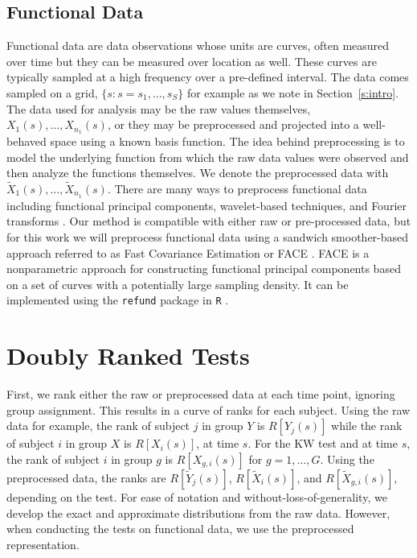 \documentclass[12pt]{article}
\theoremstyle{plain}
\begin{document}
	\subsection{Functional Data}
	
	Functional data are data observations whose units are curves, often measured over time but they can be measured over location as well. These curves are typically sampled at a high frequency over a pre-defined interval. The data comes sampled on a grid, $\{s : s = s_1, \ldots, s_S\}$ for example as we note in Section~\ref{s:intro}. The data used for analysis may be the raw values themselves, $X_1(s), \ldots, X_{n_1}(s)$, or they may be preprocessed and projected into a well-behaved space using a known basis function. The idea behind preprocessing is to model the underlying function from which the raw data values were observed and then analyze the functions themselves. We denote the preprocessed data with $\tilde{X}_1(s), \ldots, \tilde{X}_{n_1}(s)$. There are many ways to preprocess functional data including functional principal components, wavelet-based techniques, and Fourier transforms \citep{Wang2016}. Our method is compatible with either raw or pre-processed data, but for this work we will preprocess functional data using a sandwich smoother-based approach referred to as Fast Covariance Estimation or FACE \citep{Xiao2013, Xiao2016}. FACE is a nonparametric approach for constructing functional principal components based on a set of curves with a potentially large sampling density. It can be implemented using the \texttt{refund} package in \texttt{R} \citep{Refund2022}.
	
	\section{Doubly Ranked Tests}
	\label{s:drts}

	First, we rank either the raw or preprocessed data at each time point, ignoring group assignment. This results in a curve of ranks for each subject. Using the raw data for example, the rank of subject $j$ in group $Y$ is $R[Y_j(s)]$ while the rank of subject $i$ in group $X$ is $R[X_i(s)]$, at time $s$. For the KW test and at time $s$, the rank of subject $i$ in group $g$ is $R[X_{g,i}(s)]$ for $g = 1, \ldots, G$. Using the preprocessed data, the ranks are $R\left[\tilde{Y}_j(s)\right]$, $R\left[\tilde{X}_i(s)\right]$, and $R\left[\tilde{X}_{g,i}(s)\right]$, depending on the test. For ease of notation and without-loss-of-generality, we develop the exact and approximate distributions from the raw data. However, when conducting the tests on functional data, we use the preprocessed representation.
	
\end{document}
